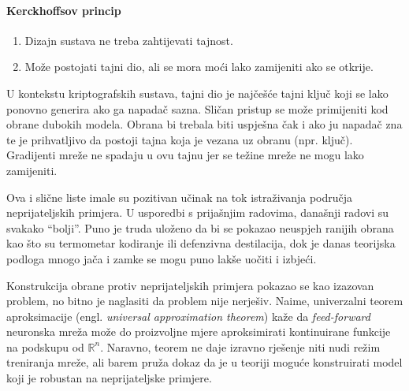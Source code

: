\documentclass[utf8, diplomski]{fer}
\begin{document}
\paragraph{Kerckhoffsov princip}
\begin{enumerate}[noitemsep,topsep=0pt,parsep=0pt,partopsep=0pt]
	\item Dizajn sustava ne treba zahtijevati tajnost.
	\item Može postojati tajni dio, ali se mora moći lako zamijeniti ako se otkrije.
\end{enumerate}
U kontekstu kriptografskih sustava, tajni dio je najčešće tajni ključ koji se lako ponovno generira ako ga napadač sazna. Sličan pristup se može primijeniti kod obrane dubokih modela. Obrana bi trebala biti uspješna čak i ako ju napadač zna te je prihvatljivo da postoji tajna koja je vezana uz obranu (npr. ključ). Gradijenti mreže ne spadaju u ovu tajnu jer se težine mreže ne mogu lako zamijeniti. 
\par
Ova i slične liste imale su pozitivan učinak na tok istraživanja područja neprijateljskih primjera. U usporedbi s prijašnjim radovima, današnji radovi su svakako ``bolji''. Puno je truda uloženo da bi se pokazao neuspjeh ranijih obrana kao što su termometar kodiranje ili defenzivna destilacija, dok je danas teorijska podloga mnogo jača i zamke se mogu puno lakše uočiti i izbjeći. \par
Konstrukcija obrane protiv neprijateljskih primjera pokazao se kao izazovan problem, no bitno je naglasiti da problem nije nerješiv. Naime, univerzalni teorem aproksimacije (engl. \textit{universal approximation theorem}) kaže da \textit{feed-forward} neuronska mreža može do proizvoljne mjere aproksimirati kontinuirane funkcije na podskupu od $\mathbb{R}^{n}$. Naravno, teorem ne daje izravno rješenje niti nudi režim treniranja mreže, ali barem pruža dokaz da je u teoriji moguće konstruirati model koji je robustan na neprijateljske primjere. 
\end{document}
